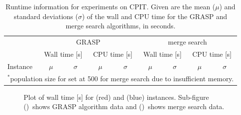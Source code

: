 \documentclass[journal]{IEEEtran}
\begin{document}
\begin{table}[h!]
\centering
\caption[Runtime information for experiments on CPIT]{Runtime information for experiments on CPIT. Given are the mean (\(\mu\)) and standard deviations (\(\sigma\)) of the wall and CPU time for the GRASP and merge search algorithms, in seconds.}\label{tab:mine:runtime}
\begin{adjustbox}{width=0.45\textwidth}
\begin{tabular}{lrrrrrrrr} \toprule
 & \multicolumn{4}{c}{GRASP} & \multicolumn{4}{c}{merge search}\\
\cmidrule(lr){2-5} \cmidrule(lr){6-9}
 & \multicolumn{2}{c}{Wall time [s]} & \multicolumn{2}{c}{CPU time [s]} & \multicolumn{2}{c}{Wall time [s]} & \multicolumn{2}{c}{CPU time [s]}\\
\cmidrule(lr){2-3}\cmidrule(lr){4-5} \cmidrule(lr){6-7}\cmidrule(lr){8-9}
Instance & \multicolumn{1}{c}{\(\mu\)}&\multicolumn{1}{c}{\(\sigma\)} & \multicolumn{1}{c}{\(\mu\)}& \multicolumn{1}{c}{\(\sigma\)}& \multicolumn{1}{c}{\(\mu\)}&\multicolumn{1}{c}{\(\sigma\)} & \multicolumn{1}{c}{\(\mu\)}& \multicolumn{1}{c}{\(\sigma\)}\\ \midrule



\bottomrule
\multicolumn{9}{l}{\(^*\)population size for \zucklarge{} set at 500 for merge search due to insufficient memory.}
\end{tabular}
\end{adjustbox}
\end{table}
%
\begin{figure}[h!]
    \centering
    \begin{subfigure}[t]{0.23\textwidth}
    \centering
    \caption{}
    \label{plot:time.1}
    \end{subfigure}
    \quad
    \begin{subfigure}[t]{0.23\textwidth}
    \centering
    \caption{}
    \label{plot:time.2}
    \end{subfigure}
    \caption[Plot of wall time {[s]} for \zucksmall{} and \dmine{} instances]{Plot of wall time [s] for \zucksmall{} (red) and \dmine{} (blue) instances. Sub-figure ()~shows GRASP algorithm data and ()~shows merge search data.}
    \label{plot:mine:time}
\end{figure}
%
\end{document}
